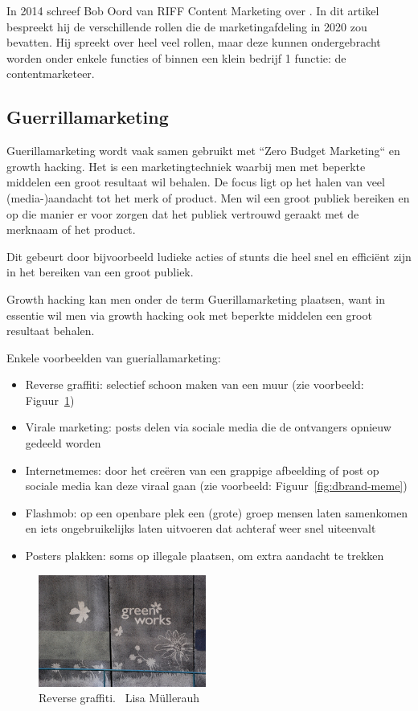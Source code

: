 In 2014 schreef Bob Oord van RIFF Content Marketing over  \autocite{Oord2014}. In dit artikel bespreekt hij de verschillende rollen die de marketingafdeling in 2020 zou bevatten. Hij spreekt over heel veel rollen, maar deze kunnen ondergebracht worden onder enkele functies of binnen een klein bedrijf 1 functie: de contentmarketeer. 

\subsection{Guerrillamarketing} \label{subsec:guerrillamarketing}
Guerillamarketing wordt vaak samen gebruikt met ``Zero Budget Marketing`` en growth hacking. Het is een marketingtechniek waarbij men met beperkte middelen een groot resultaat wil behalen. De focus ligt op het halen van veel (media-)aandacht tot het merk of product. Men wil een groot publiek bereiken en op die manier er voor zorgen dat het publiek vertrouwd geraakt met de merknaam of het product.

Dit gebeurt door bijvoorbeeld ludieke acties of stunts die heel snel en efficiënt zijn in het bereiken van een groot publiek. 

Growth hacking kan men onder de term Guerillamarketing plaatsen, want in essentie wil men via growth hacking ook met beperkte middelen een groot resultaat behalen.

Enkele voorbeelden van gueriallamarketing:
 
\begin{itemize}
	\item Reverse graffiti: selectief schoon maken van een muur (zie voorbeeld: Figuur~\ref{fig:reverse-graffiti})
	\item Virale marketing: posts delen via sociale media die de ontvangers opnieuw gedeeld worden
	\item Internetmemes: door het creëren van een grappige afbeelding of post op sociale media kan deze viraal gaan (zie voorbeeld: Figuur~\ref{fig:dbrand-meme})
	\item Flashmob: op een openbare plek een (grote) groep mensen laten samenkomen en iets ongebruikelijks laten uitvoeren dat achteraf weer snel uiteenvalt
	\item Posters plakken: soms op illegale plaatsen, om extra aandacht te trekken
\end{itemize}

\begin{figure}[h!]
	\includegraphics[width=55mm]{img/reverse-graffiti.jpg}
	\centering
	\caption{Reverse graffiti. \textcopyright~Lisa Müllerauh}
	\label{fig:reverse-graffiti}
\end{figure}

